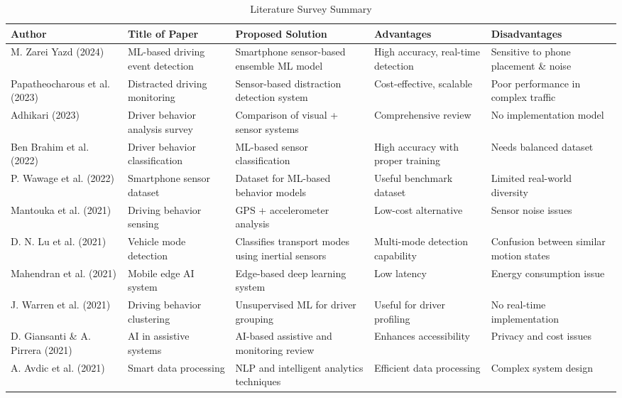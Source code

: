 \begin{table}[H]
\centering
\small
\caption{Literature Survey Summary}
\label{tab:lit_survey_summary}
\begin{tabularx}{\textwidth}{lp{3.5cm}p{3.5cm}p{2.5cm}p{2.5cm}}
\toprule
\textbf{Author} & \textbf{Title of Paper} & \textbf{Proposed Solution} & \textbf{Advantages} & \textbf{Disadvantages} \\
\midrule
M. Zarei Yazd (2024) & ML-based driving event detection & Smartphone sensor-based ensemble ML model & High accuracy, real-time detection & Sensitive to phone placement \& noise \\
\addlinespace
Papatheocharous et al. (2023) & Distracted driving monitoring & Sensor-based distraction detection system & Cost-effective, scalable & Poor performance in complex traffic \\
\addlinespace
Adhikari (2023) & Driver behavior analysis survey & Comparison of visual + sensor systems & Comprehensive review & No implementation model \\
\addlinespace
Ben Brahim et al. (2022) & Driver behavior classification & ML-based sensor classification & High accuracy with proper training & Needs balanced dataset \\
\addlinespace
P. Wawage et al. (2022) & Smartphone sensor dataset & Dataset for ML-based behavior models & Useful benchmark dataset & Limited real-world diversity \\
\addlinespace
Mantouka et al. (2021) & Driving behavior sensing & GPS + accelerometer analysis & Low-cost alternative & Sensor noise issues \\
\addlinespace
D. N. Lu et al. (2021) & Vehicle mode detection & Classifies transport modes using inertial sensors & Multi-mode detection capability & Confusion between similar motion states \\
\addlinespace
Mahendran et al. (2021) & Mobile edge AI system & Edge-based deep learning system & Low latency & Energy consumption issue \\
\addlinespace
J. Warren et al. (2021) & Driving behavior clustering & Unsupervised ML for driver grouping & Useful for driver profiling & No real-time implementation \\
\addlinespace
D. Giansanti \& A. Pirrera (2021) & AI in assistive systems & AI-based assistive and monitoring review & Enhances accessibility & Privacy and cost issues \\
\addlinespace
A. Avdic et al. (2021) & Smart data processing & NLP and intelligent analytics techniques & Efficient data processing & Complex system design \\

\end{tabularx}
\end{table}
